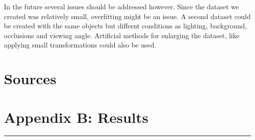 \documentclass[	DIV=calc,%
				paper=a4,%
				fontsize=11pt,%
				twocolumn]{scrartcl}	 %
\newcommand{\HorRule}{\color{brsublue}%
					 \rule{\linewidth}{1pt}%
					 \color{black}
					 }
\begin{document}
In the future several issues should be addressed however. Since the dataset we created was relatively small, overfitting might be an issue. A second dataset could be created with the same objects but differnt conditions as lighting, background, occlusions and viewing angle. Artificial methods for enlarging the dataset, like applying small transformations could also be used.

\newpage

\section*{Sources}

\newpage

\onecolumn

\section*{Appendix B: Results}

\HorRule
\end{document}
